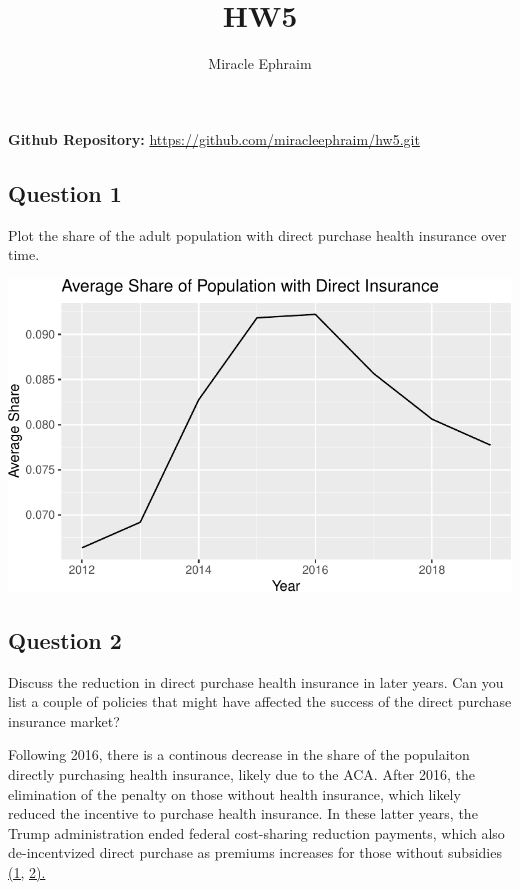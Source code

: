 \documentclass[
]{article}
\title{HW5}
\author{Miracle Ephraim}
\date{}
\begin{document}
\maketitle


\textbf{Github Repository:}
\url{https://github.com/miracleephraim/hw5.git}

\subsection{Question 1}\label{question-1}

Plot the share of the adult population with direct purchase health
insurance over time.

\includegraphics{ephraim-m-hwk5-1_files/figure-pdf/unnamed-chunk-1-1.pdf}

\subsection{Question 2}\label{question-2}

Discuss the reduction in direct purchase health insurance in later
years. Can you list a couple of policies that might have affected the
success of the direct purchase insurance market?

Following 2016, there is a continous decrease in the share of the
populaiton directly purchasing health insurance, likely due to the ACA.
After 2016, the elimination of the penalty on those without health
insurance, which likely reduced the incentive to purchase health
insurance. In these latter years, the Trump administration ended federal
cost-sharing reduction payments, which also de-incentvized direct
purchase as premiums increases for those without subsidies
\href{https://www.kff.org/private-insurance/issue-brief/as-aca-marketplace-enrollment-reaches-record-high-fewer-are-buying-individual-market-coverage-elsewhere/\#:~:text=During\%20this\%20period\%20of\%20decreasing,Figure\%201}{(1,}
\href{https://usafacts.org/articles/affordable-care-act-and-data-who-insured-and-who-isnt/\#:~:text=Individual\%20mandate,Employer\%20mandate}{2).}
\end{document}
